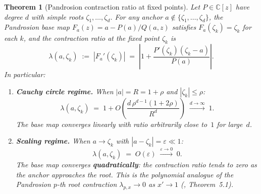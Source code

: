 \documentclass[10pt,a4paper,oneside]{book}
\newtheorem{theorem}{Theorem}[chapter]
\theoremstyle{definition}
\theoremstyle{remark}
\newcommand{\CC}{\mathbb{C}}
\begin{document}
\begin{theorem}[Pandrosion contraction ratio at fixed points]
\label{thm:contraction_ratio}
Let $P \in \CC[z]$ have degree $d$ with simple roots $\zeta_1, \ldots, \zeta_d$.  For any anchor $a \notin \{\zeta_1,\ldots,\zeta_d\}$, the Pandrosion base map $F_a(z) = a - P(a)/Q(a,z)$ satisfies $F_a(\zeta_k) = \zeta_k$ for each $k$, and the contraction ratio at the fixed point $\zeta_k$ is
\begin{equation}
  \label{eq:contraction_ratio}
  \lambda(a,\zeta_k) \;:=\; |F_a'(\zeta_k)| \;=\; \left|1 + \frac{P'(\zeta_k)(\zeta_k - a)}{P(a)}\right|.
\end{equation}
In particular:
\begin{enumerate}
  \item[\textup{(i)}] \textbf{Cauchy circle regime.}  When $|a| = R = 1+\rho$ and $|\zeta_k| \leq \rho$:
  \[
    \lambda(a,\zeta_k) \;=\; 1 + O\!\left(\frac{d\,\rho^{d-1}(1+2\rho)}{R^d}\right) \;\xrightarrow{d\to\infty}\; 1.
  \]
  The base map converges linearly with ratio arbitrarily close to~$1$ for large~$d$.
  \item[\textup{(ii)}] \textbf{Scaling regime.}  When $a \to \zeta_k$ with $|a - \zeta_k| = \varepsilon \ll 1$:
  \[
    \lambda(a,\zeta_k) \;=\; O(\varepsilon) \;\xrightarrow{\varepsilon\to 0}\; 0.
  \]
  The base map converges \textbf{quadratically}: the contraction ratio tends to zero as the anchor approaches the root.  This is the polynomial analogue of the Pandrosion $p$-th root contraction $\lambda_{p,x} \to 0$ as $x' \to 1$ (\cite{besevic2026}, Theorem~5.1).
\end{enumerate}
\end{theorem}
\end{document}
